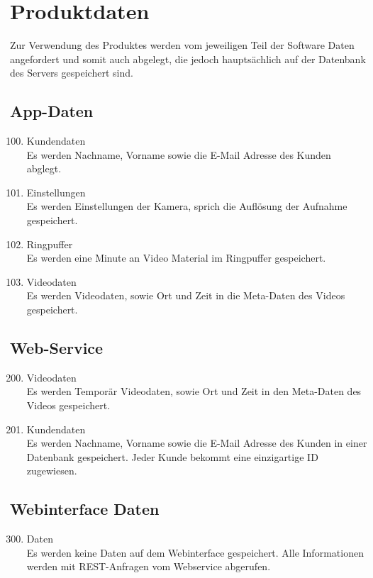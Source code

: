 \chapter{Produktdaten}
Zur Verwendung des Produktes werden vom jeweiligen Teil der Software Daten angefordert und somit auch abgelegt, die jedoch haupts\"achlich auf der Datenbank des Servers gespeichert sind.
\section{App-Daten}
\begin{enumerate}[\bfseries{PD}10]
	\setcounter{enumi}{99}
\item Kundendaten \hfill \\
Es werden Nachname, Vorname sowie die E-Mail Adresse des Kunden abglegt.
\item Einstellungen \hfill \\
Es werden Einstellungen der Kamera, sprich die Auflösung der Aufnahme gespeichert.
\item Ringpuffer \hfill \\
Es werden eine Minute an Video Material im Ringpuffer gespeichert.
\item Videodaten \hfill \\
Es werden Videodaten, sowie Ort und Zeit in die Meta-Daten des Videos gespeichert.
\end{enumerate}

\section{Web-Service}
\begin{enumerate}[\bfseries{PK}10]
	\setcounter{enumi}{199}
\item Videodaten \hfill \\
Es werden Temporär Videodaten, sowie Ort und Zeit in den Meta-Daten des Videos gespeichert.
\item Kundendaten \hfill \\
Es werden Nachname, Vorname sowie die E-Mail Adresse des Kunden in einer Datenbank gespeichert. Jeder Kunde bekommt eine einzigartige ID zugewiesen. 
\end{enumerate}

\section{Webinterface Daten}
\begin{enumerate}[\bfseries{PK}10]
	\setcounter{enumi}{299}
\item Daten \hfill \\
Es werden keine Daten auf dem Webinterface gespeichert. Alle Informationen werden mit REST-Anfragen vom Webservice abgerufen.
\end{enumerate}


